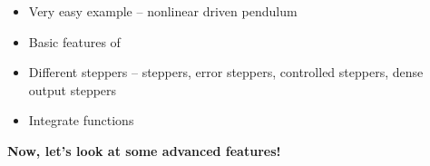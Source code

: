 \begin{frame}
 

 \vspace{2ex}
 \begin{itemize}
  \item Very easy example -- nonlinear driven pendulum
  \item Basic features of \odeint
  \item Different steppers -- steppers, error steppers, controlled steppers, dense output steppers
  \item Integrate functions
 \end{itemize}

 \vspace{2ex}

 \centerline{\bf Now, let's look at some advanced features!}

\end{frame}









